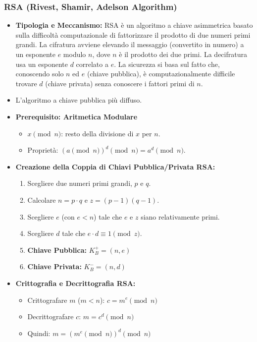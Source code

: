 \subsubsection{RSA (Rivest, Shamir, Adelson Algorithm)}
\begin{itemize}
    \item \textbf{Tipologia e Meccanismo:} RSA è un algoritmo a chiave asimmetrica basato sulla difficoltà computazionale di fattorizzare il prodotto di due numeri primi grandi. La cifratura avviene elevando il messaggio (convertito in numero) a un esponente $e$ modulo $n$, dove $n$ è il prodotto dei due primi. La decifratura usa un esponente $d$ correlato a $e$. La sicurezza si basa sul fatto che, conoscendo solo $n$ ed $e$ (chiave pubblica), è computazionalmente difficile trovare $d$ (chiave privata) senza conoscere i fattori primi di $n$.
    \item L'algoritmo a chiave pubblica più diffuso.
    \item \textbf{Prerequisito: Aritmetica Modulare}
    \begin{itemize}
        \item $x \pmod n$: resto della divisione di $x$ per $n$.
        \item Proprietà: $(a \pmod n)^d \pmod n = a^d \pmod n$.
    \end{itemize}
    \item \textbf{Creazione della Coppia di Chiavi Pubblica/Privata RSA:}
    \begin{enumerate}
        \item Scegliere due numeri primi grandi, $p$ e $q$.
        \item Calcolare $n = p \cdot q$ e $z = (p-1)(q-1)$.
        \item Scegliere $e$ (con $e<n$) tale che $e$ e $z$ siano relativamente primi.
        \item Scegliere $d$ tale che $e \cdot d \equiv 1 \pmod z$.
        \item \textbf{Chiave Pubblica:} $K_B^+ = (n, e)$
        \item \textbf{Chiave Privata:} $K_B^- = (n, d)$
    \end{enumerate}
    \item \textbf{Crittografia e Decrittografia RSA:}
    \begin{itemize}
        \item Crittografare $m$ ($m < n$): $c = m^e \pmod n$
        \item Decrittografare $c$: $m = c^d \pmod n$
        \item Quindi: $m = (m^e \pmod n)^d \pmod n$

\end{itemize}
\end{itemize}
